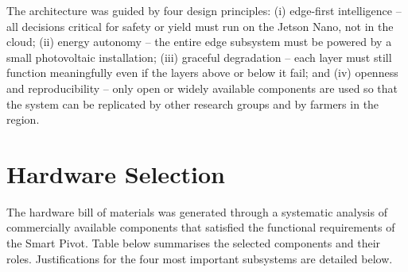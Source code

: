 \documentclass[12pt,a4paper]{report}
\begin{document}
The architecture was guided by four design principles: (i) edge-first intelligence -- all decisions critical for safety or yield must run on the Jetson Nano, not in the cloud; (ii) energy autonomy -- the entire edge subsystem must be powered by a small photovoltaic installation; (iii) graceful degradation -- each layer must still function meaningfully even if the layers above or below it fail; and (iv) openness and reproducibility -- only open or widely available components are used so that the system can be replicated by other research groups and by farmers in the region.

\section{Hardware Selection}

The hardware bill of materials was generated through a systematic analysis of commercially available components that satisfied the functional requirements of the Smart Pivot. Table below summarises the selected components and their roles. Justifications for the four most important subsystems are detailed below.
\end{document}

